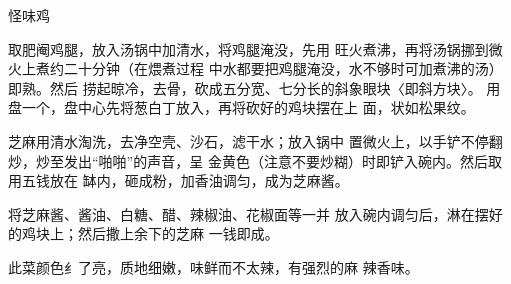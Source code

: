 \begin{recipe}{怪味鸡}

\ingredients


\cooking

\step 取肥阉鸡腿，放入汤锅中加清水，将鸡腿淹没，先用 旺火煮沸，再将汤锅挪到微火上煮约二十分钟（在煨煮过程 中水都要把鸡腿淹没，水不够时可加煮沸的汤）即熟。然后 捞起晾冷，去骨，砍成五分宽、七分长的斜象眼块〈即斜方块〉。 用盘一个，盘中心先将葱白丁放入，再将砍好的鸡块摆在上 面，状如松果纹。

\step 芝麻用清水淘洗，去净空壳、沙石，滤干水；放入锅中 置微火上，以手铲不停翻炒，炒至发出“啪啪”的声音，呈 金黄色（注意不要炒糊）时即铲入碗内。然后取用五钱放在 缽内，砸成粉，加香油调匀，成为芝麻酱。

将芝麻酱、酱油、白糖、醋、辣椒油、花椒面等一并 放入碗内调匀后，淋在摆好的鸡块上；然后撒上余下的芝麻 一钱即成。

\notes

此菜颜色纟了亮，质地细嫩，味鲜而不太辣，有强烈的麻 辣香味。

\end{recipe}

